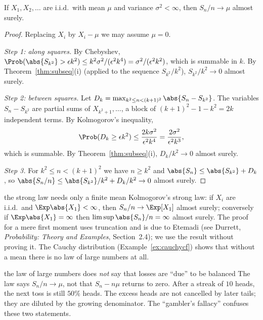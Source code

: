 \begin{theorem}\label{thm:slln}
If $X_1,X_2,\dots$ are i.i.d.\ with mean $\mu$ and variance $\sigma^2<\infty$, then
$S_n/n\to\mu$ almost surely.
\end{theorem}
\begin{proof}
Replacing $X_i$ by $X_i-\mu$ we may assume $\mu=0$.

\emph{Step 1: along squares.} By Chebyshev, $\Prob(\abs{S_{k^2}}>\epsilon k^2)\le
k^2\sigma^2/(\epsilon^2k^4)=\sigma^2/(\epsilon^2k^2)$, which is summable in $k$. By
Theorem~\ref{thm:subseq}(i) (applied to the sequence $S_{k^2}/k^2$), $S_{k^2}/k^2\to0$
almost surely.

\emph{Step 2: between squares.} Let $D_k=\max_{k^2\le n<(k+1)^2}\abs{S_n-S_{k^2}}$.
The variables $S_n-S_{k^2}$ are partial sums of $X_{k^2+1},\dots$, a block of
$(k+1)^2-1-k^2=2k$ independent terms. By Kolmogorov's inequality,
\[
\Prob(D_k\ge\epsilon k^2)\le\frac{2k\sigma^2}{\epsilon^2k^4}=\frac{2\sigma^2}{\epsilon^2k^3},
\]
which is summable. By Theorem~\ref{thm:subseq}(i), $D_k/k^2\to0$ almost surely.

\emph{Step 3.} For $k^2\le n<(k+1)^2$ we have $n\ge k^2$ and
$\abs{S_n}\le\abs{S_{k^2}}+D_k$, so $\abs{S_n/n}\le\abs{S_{k^2}}/k^2+D_k/k^2\to0$
almost surely.
\end{proof}

\begin{nuance}{the strong law needs only a finite mean}
Kolmogorov's strong law: if $X_i$ are i.i.d.\ and $\Exp\abs{X_1}<\infty$, then
$S_n/n\to\Exp[X_1]$ almost surely; conversely if $\Exp\abs{X_1}=\infty$ then
$\limsup\abs{S_n}/n=\infty$ almost surely. The proof for a mere first moment uses
truncation and is due to Etemadi (see Durrett, \emph{Probability: Theory and
Examples}, Section~2.4); we use the result without proving it. The Cauchy
distribution (Example~\ref{ex:cauchycf}) shows that without a mean there is no law
of large numbers at all.
\end{nuance}

\begin{pitfall}{the law of large numbers does \emph{not} say that losses are ``due'' to be balanced}
The law says $S_n/n\to\mu$, not that $S_n-n\mu$ returns to zero. After a streak of
$10$ heads, the next toss is still $50\%$ heads. The excess heads are not cancelled
by later tails; they are diluted by the growing denominator. The ``gambler's
fallacy'' confuses these two statements.
\end{pitfall}

